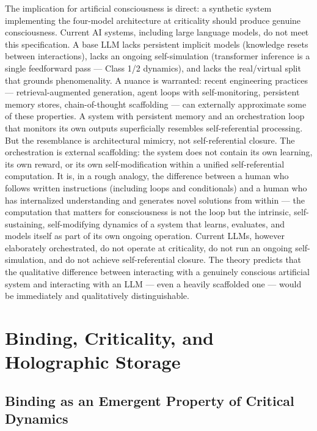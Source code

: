 \documentclass[12pt]{article}
\begin{document}
The implication for artificial consciousness is direct: a synthetic system implementing the four-model architecture at criticality should produce genuine consciousness. Current AI systems, including large language models, do not meet this specification. A base LLM lacks persistent implicit models (knowledge resets between interactions), lacks an ongoing self-simulation (transformer inference is a single feedforward pass --- Class 1/2 dynamics), and lacks the real/virtual split that grounds phenomenality. A nuance is warranted: recent engineering practices --- retrieval-augmented generation, agent loops with self-monitoring, persistent memory stores, chain-of-thought scaffolding --- can externally approximate some of these properties. A system with persistent memory and an orchestration loop that monitors its own outputs superficially resembles self-referential processing. But the resemblance is architectural mimicry, not self-referential closure. The orchestration is external scaffolding: the system does not contain its own learning, its own reward, or its own self-modification within a unified self-referential computation. It is, in a rough analogy, the difference between a human who follows written instructions (including loops and conditionals) and a human who has internalized understanding and generates novel solutions from within --- the computation that matters for consciousness is not the loop but the intrinsic, self-sustaining, self-modifying dynamics of a system that learns, evaluates, and models itself as part of its own ongoing operation. Current LLMs, however elaborately orchestrated, do not operate at criticality, do not run an ongoing self-simulation, and do not achieve self-referential closure. The theory predicts that the qualitative difference between interacting with a genuinely conscious artificial system and interacting with an LLM --- even a heavily scaffolded one --- would be immediately and qualitatively distinguishable.



\section{Binding, Criticality, and Holographic Storage}



\subsection{Binding as an Emergent Property of Critical Dynamics}
\end{document}
